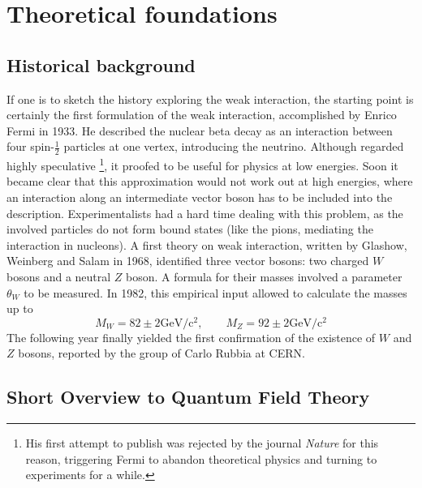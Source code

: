 \section{Theoretical foundations}
\subsection{Historical background}
If one is to sketch the history exploring the weak interaction, 
the starting point is certainly the first formulation of the 
weak interaction, accomplished by Enrico Fermi in 1933. 
He described the nuclear beta decay as an interaction 
between four spin-$\frac{1}{2}$ particles at one vertex, 
introducing the neutrino. Although regarded highly speculative%
\footnote{His first attempt to publish was rejected by the journal
\emph{Nature} for this reason, triggering Fermi to abandon 
theoretical physics and turning to experiments for a while.}, 
it proofed to be useful for physics at low energies. 
Soon it became clear that this approximation would not work out 
at high energies, where an interaction along an intermediate 
vector boson has to be included into the description. 
Experimentalists had a hard time dealing with this problem, 
as the involved particles do not form bound states (like the 
pions, mediating the interaction in nucleons). A first theory
on weak interaction, written by Glashow, Weinberg and Salam 
in 1968, identified three vector bosons: two charged $W$ bosons 
and a neutral $Z$ boson. A formula for their masses involved a 
parameter $\theta_W$ to be measured. In 1982, this empirical 
input allowed to calculate the masses up to
\begin{equation}
    M_W = 82 \pm 2 \mathrm{GeV / c^2},\qquad 
    M_Z = 92 \pm 2 \mathrm{GeV / c^2}
\end{equation}
The following year finally yielded the first confirmation 
of the existence of $W$ and $Z$ bosons, reported by the group 
of Carlo Rubbia at CERN\@.

\subsection{Short Overview to Quantum Field Theory}
\label{sub:qft}

